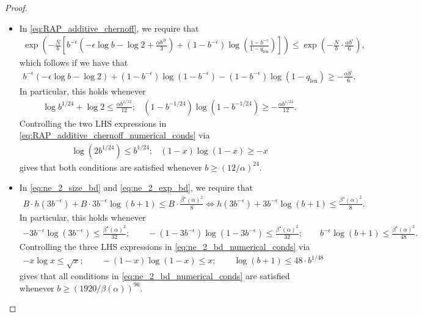 \documentclass[11pt]{amsart}
\numberwithin{equation}{section}
\numberwithin{equation}{section}
\newcommand{\1}{\mathbbm{1}}
\theoremstyle{definition}
\begin{document}
\begin{appendices}
\begin{proof}
\begin{itemize}
        \item In \eqref{eq:RAP_additive_chernoff}, we require that
        \begin{align*}
            \exp\left( -\frac{N}{b} \left[ b^{-\epsilon} \left( -\epsilon \log b - \log 2 + \frac{\alpha b^{2\epsilon}}{3} \right) + (1-b^{-\epsilon}) \log\left( \frac{1-b^{-\epsilon}}{1-q_{\text{len}}} \right) \right] \right) \leq \exp\left( - \frac{N}{b} \cdot \frac{\alpha b^\epsilon}{6} \right),
        \end{align*}
        which follows if we have that
        \begin{align*}
            b^{-\epsilon} \left( -\epsilon \log b - \log 2  \right) + (1-b^{-\epsilon})\log(1-b^{-\epsilon}) - (1-b^{-\epsilon}) \log\left(1-q_{\text{len}}\right) \geq -\frac{\alpha b^\epsilon}{6}.
        \end{align*}
        In particular, this holds whenever
        \begin{align} \label{eq:RAP_additive_chernoff_numerical_conds}
            & \log b^{1/24} + \log 2 \leq \frac{\alpha b^{1/12}}{12};
            & (1-b^{-1/24})\log(1-b^{-1/24}) \geq -\frac{\alpha b^{1/24}}{12}.
        \end{align}
        Controlling the two LHS expressions in \eqref{eq:RAP_additive_chernoff_numerical_conds} via
        \begin{align*}
            & \log \left( 2b^{1/24} \right) \leq b^{1/24};
            & (1-x)\log(1-x) \geq -x
        \end{align*}
        gives that both conditions are satisfied whenever $b \geq (12/\alpha)^{24}$.
        
        \item In \eqref{eq:ne_2_size_bd} and \eqref{eq:ne_2_exp_bd}, we require that
        \begin{align*}
            B \cdot h(3b^{-\epsilon}) + B \cdot 3b^{-\epsilon} \log (b+1) \leq B \cdot \frac{\beta^\star(\alpha)^2}{8} \iff h(3b^{-\epsilon}) + 3b^{-\epsilon} \log (b+1) \leq \frac{\beta^\star(\alpha)^2}{8}.
        \end{align*}
        In particular, this holds whenever
        \begin{align} \label{eq:ne_2_bd_numerical_conds}
            -3b^{-\epsilon}\log(3b^{-\epsilon}) \leq \frac{\beta^\star(\alpha)^2}{32}; \qquad -(1-3b^{-\epsilon})\log(1-3b^{-\epsilon}) \leq \frac{\beta^\star(\alpha)^2}{32}; \qquad b^{-\epsilon}\log(b+1) \leq \frac{\beta^\star(\alpha)^2}{48}.
        \end{align}
        Controlling the three LHS expressions in \eqref{eq:ne_2_bd_numerical_conds} via
        \begin{align*}
            -x\log x \leq \sqrt{x}; \qquad -(1-x)\log(1-x)\leq x; \qquad \log(b+1) \leq 48 \cdot b^{1/48}
        \end{align*}
        gives that all conditions in \eqref{eq:ne_2_bd_numerical_conds} are satisfied whenever $b \geq \left( 1920/\beta(\alpha) \right)^{96}$.
        

\end{itemize}
\end{proof}
\end{appendices}
\end{document}
